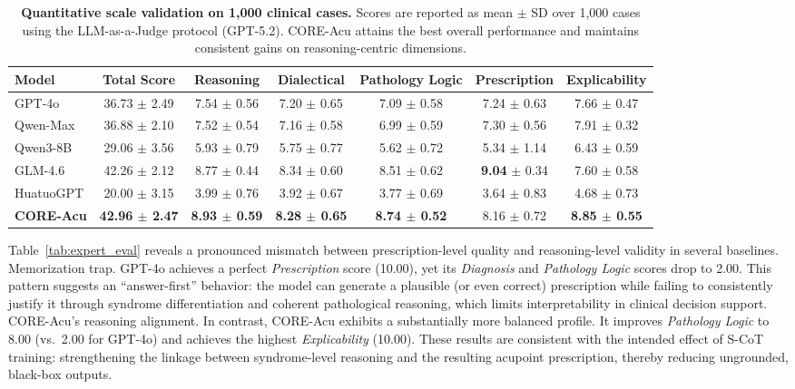 \documentclass[preprint,5p,times,twocolumn,fleqn]{elsarticle}
\begin{document}
\begin{table}[t]
\centering
\caption{\textbf{Quantitative scale validation on 1{,}000 clinical cases.}
Scores are reported as mean $\pm$ SD over 1{,}000 cases using the LLM-as-a-Judge protocol (GPT-5.2). CORE-Acu attains the best overall performance and maintains consistent gains on reasoning-centric dimensions.}
\label{tab:llm_scale_eval}
\renewcommand{\arraystretch}{1.2}
\setlength{\tabcolsep}{8pt}

\begin{tabular*}{\textwidth}{@{\extracolsep{\fill}}lcccccc}
\toprule
\textbf{Model} & \textbf{Total Score} & \textbf{Reasoning} & \textbf{Dialectical} & \textbf{Pathology Logic} & \textbf{Prescription} & \textbf{Explicability} \\
\midrule
GPT-4o            & 36.73 $\pm$ 2.49 & 7.54 $\pm$ 0.56 & 7.20 $\pm$ 0.65 & 7.09 $\pm$ 0.58 & 7.24 $\pm$ 0.63 & 7.66 $\pm$ 0.47 \\
Qwen-Max          & 36.88 $\pm$ 2.10 & 7.52 $\pm$ 0.54 & 7.16 $\pm$ 0.58 & 6.99 $\pm$ 0.59 & 7.30 $\pm$ 0.56 & 7.91 $\pm$ 0.32 \\
Qwen3-8B          & 29.06 $\pm$ 3.56 & 5.93 $\pm$ 0.79 & 5.75 $\pm$ 0.77 & 5.62 $\pm$ 0.72 & 5.34 $\pm$ 1.14 & 6.43 $\pm$ 0.59 \\
GLM-4.6           & 42.26 $\pm$ 2.12 & 8.77 $\pm$ 0.44 & 8.34 $\pm$ 0.60 & 8.51 $\pm$ 0.62 & \textbf{ 9.04 }$\pm$ 0.34 & 7.60 $\pm$ 0.58 \\
HuatuoGPT            & 20.00 $\pm$ 3.15 & 3.99 $\pm$ 0.76 & 3.92 $\pm$ 0.67 & 3.77 $\pm$ 0.69 & 3.64 $\pm$ 0.83 & 4.68 $\pm$ 0.73 \\
\textbf{CORE-Acu} & \textbf{42.96 $\pm$ 2.47} & \textbf{8.93 $\pm$ 0.59} & \textbf{8.28 $\pm$ 0.65} & \textbf{8.74 $\pm$ 0.52} & 8.16 $\pm$ 0.72 & \textbf{8.85 $\pm$ 0.55} \\
\bottomrule
\end{tabular*}
\end{table}


Table~\ref{tab:expert_eval} reveals a pronounced mismatch between prescription-level quality and reasoning-level validity in several baselines.
Memorization trap. GPT-4o achieves a perfect \textit{Prescription} score (10.00), yet its \textit{Diagnosis} and \textit{Pathology Logic} scores drop to 2.00. This pattern suggests an ``answer-first'' behavior: the model can generate a plausible (or even correct) prescription while failing to consistently justify it through syndrome differentiation and coherent pathological reasoning, which limits interpretability in clinical decision support.
CORE-Acu's reasoning alignment. In contrast, CORE-Acu exhibits a substantially more balanced profile. It improves \textit{Pathology Logic} to 8.00 (vs.\ 2.00 for GPT-4o) and achieves the highest \textit{Explicability} (10.00). These results are consistent with the intended effect of S-CoT training: strengthening the linkage between syndrome-level reasoning and the resulting acupoint prescription, thereby reducing ungrounded, black-box outputs.
\end{document}
